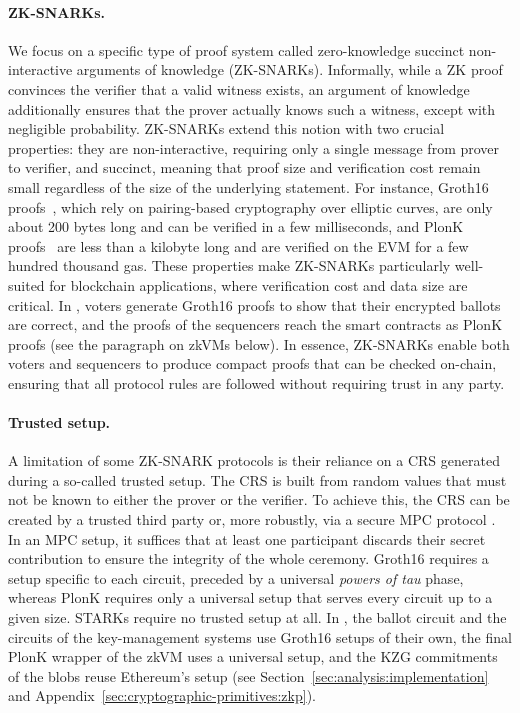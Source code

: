 \paragraph{\Acp{ZK-SNARK}.}
We focus on a specific type of proof system called zero-knowledge succinct non-interactive arguments of knowledge (\acsp{ZK-SNARK}).
Informally, while a \ac{ZK} proof convinces the verifier that a valid witness exists, an argument of knowledge additionally ensures that the prover actually knows such a witness, except with negligible probability. \acsp{ZK-SNARK} extend this notion with two crucial properties: they are non-interactive, requiring only a single message from prover to verifier, and succinct, meaning that proof size and verification cost remain small regardless of the size of the underlying statement. For instance, Groth16 proofs~\cite{groth2016size}, which rely on pairing-based cryptography over elliptic curves, are only about 200 bytes long and can be verified in a few milliseconds, and PlonK proofs~\cite{gabizon2019plonk} are less than a kilobyte long and are verified on the \ac{EVM} for a few hundred thousand gas. These properties make \acsp{ZK-SNARK} particularly well-suited for blockchain applications, where verification cost and data size are critical. In \davinci, voters generate Groth16 proofs to show that their encrypted ballots are correct, and the proofs of the sequencers reach the smart contracts as PlonK proofs (see the paragraph on \acp{zkVM} below). In essence, \acsp{ZK-SNARK} enable both voters and sequencers to produce compact proofs that can be checked on-chain, ensuring that all protocol rules are followed without requiring trust in any party.

\paragraph{Trusted setup.}
A limitation of some \ac{ZK-SNARK} protocols is their reliance on a \ac{CRS} generated during a so-called trusted setup. The \ac{CRS} is built from random values that must not be known to either the prover or the verifier. To achieve this, the \ac{CRS} can be created by a trusted third party or, more robustly, via a secure \ac{MPC} protocol \cite{canetti2001universally}. In an MPC setup, it suffices that at least one participant discards their secret contribution to ensure the integrity of the whole ceremony. Groth16 requires a setup specific to each circuit, preceded by a universal \emph{powers of tau} phase, whereas PlonK requires only a universal setup that serves every circuit up to a given size. \acp{STARK} require no trusted setup at all. In \davinci, the ballot circuit and the circuits of the key-management systems use Groth16 setups of their own, the final PlonK wrapper of the \ac{zkVM} uses a universal setup, and the \ac{KZG} commitments of the blobs reuse Ethereum's setup (see Section~\ref{sec:analysis:implementation} and Appendix~\ref{sec:cryptographic-primitives:zkp}).

